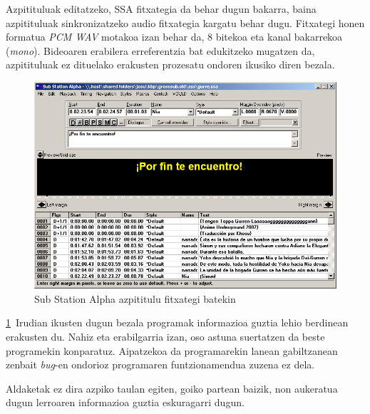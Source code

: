 Azpitituluak editatzeko, SSA fitxategia da behar dugun bakarra, baina azpitituluak sinkronizatzeko audio fitxategia kargatu behar dugu. Fitxategi honen formatua \textit{PCM WAV} motakoa izan behar da, 8 bitekoa eta kanal bakarrekoa (\textit{mono}). Bideoaren erabilera erreferentzia bat edukitzeko mugatzen da, azpitituluak ez dituelako erakusten prozesatu ondoren ikusiko diren bezala.
\begin{figure}[htb]
\begin{center}
\includegraphics[width=\columnwidth, natwidth=789pt, natheight=540pt]{Pictures/Chapter2/ssa-script.png}
\caption{Sub Station Alpha azpititulu fitxategi batekin}
\label{ssa-script}
\end{center}
\end{figure}

\ref{ssa-script}~Irudian ikusten dugun bezala programak informazioa guztia lehio berdinean erakusten du. Nahiz eta erabilgarria izan, oso astuna suertatzen da beste programekin konparatuz. Aipatzekoa da programarekin lanean gabiltzanean zenbait \textit{bug}-en ondorioz programaren funtzionamendua zuzena ez dela.

Aldaketak ez dira azpiko taulan egiten, goiko partean baizik, non aukeratua dugun lerroaren informazioa guztia eskuragarri dugun.

